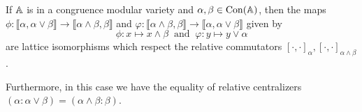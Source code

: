 \documentclass[letterpaper,11pt]{article}
\DeclareMathOperator{\Con}{Con}
\begin{document}
\begin{thm}\label{diamond-isom} If $\mathbb{A}$ is in a congruence modular variety and $\alpha, \beta \in \Con(\bA)$, then the maps $\phi : \llbracket \alpha,\alpha\vee \beta\rrbracket \rightarrow \llbracket \alpha\wedge \beta, \beta\rrbracket$ and $\varphi: \llbracket\alpha\wedge \beta, \beta\rrbracket \rightarrow \llbracket\alpha,\alpha\vee \beta\rrbracket$ given by
\[
\phi : x \mapsto x\wedge \beta\ \text{ and }\ \varphi : y \mapsto y\vee \alpha
\]
are lattice isomorphisms which respect the relative commutators $[\cdot,\cdot]_\alpha, [\cdot,\cdot]_{\alpha\wedge\beta}$.

Furthermore, in this case we have the equality of relative centralizers $(\alpha:\alpha\vee\beta) = (\alpha\wedge\beta:\beta)$.
\end{thm}
\end{document}
